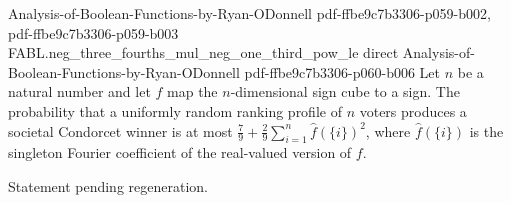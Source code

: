\begin{theorem}
  {Analysis-of-Boolean-Functions-by-Ryan-ODonnell}
  {pdf-ffbe9c7b3306-p059-b002,
    pdf-ffbe9c7b3306-p059-b003}
\proofstep
  {FABL.neg_three_fourths_mul_neg_one_third_pow_le}
  {direct}
  {Analysis-of-Boolean-Functions-by-Ryan-ODonnell}
  {pdf-ffbe9c7b3306-p060-b006}
Let $n$ be a natural number and let $f$ map the $n$-dimensional sign cube to a sign. The
probability that a uniformly random ranking profile of $n$ voters produces a societal
Condorcet winner is at most $\frac79+\frac29\sum_{i=1}^n \widehat{f}(\{i\})^2$, where
$\widehat{f}(\{i\})$ is the singleton Fourier coefficient of the real-valued version of
$f$.
\end{theorem}

\begin{theorem}
\label{FABL.exists_signedDictator_relativeHammingDist_le_of_condorcetWinnerProbability_eq_one_sub}
\leanok
{}
Statement pending regeneration.
\end{theorem}

